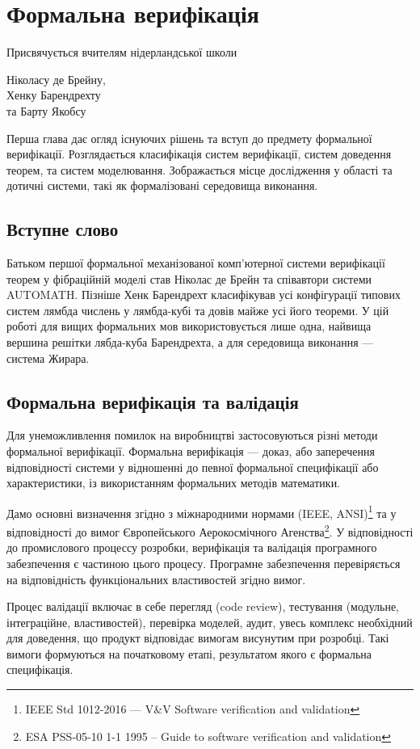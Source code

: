 \chapter{Формальна верифікація}
\epigraph{Присвячується вчителям нідерландської школи}{Ніколасу де Брейну, \\ Хенку Барендрехту \\ та Барту Якобсу}

Перша глава дає огляд існуючих рішень та вступ до предмету формальної верифікації.
Розглядається класифікація систем верифікації, систем доведення теорем, та систем
моделювання. Зображається місце дослідження у області та дотичні системи, такі як
формалізовані середовища виконання.

\section*{Вступне слово}
Батьком першої формальної механізованої комп'ютерної системи верифікації теорем у
фібраційній моделі став Ніколас де Брейн та співавтори системи AUTOMATH.
Пізніше Хенк Барендрехт класифікував усі конфігурації типових систем
лямбда числень у лямбда-кубі та довів майже усі його теореми. У цій роботі
для вищих формальних мов використовується лише одна,
найвища вершина решітки лябда-куба Барендрехта, а для середовища
виконання --- система Жирара.

\section{Формальна верифікація та валідація}
Для унеможливлення помилок на виробництві застосовуються різні
методи формальної верифікації. Формальна верифікація — доказ, або заперечення
відповідності системи у відношенні до певної формальної специфікації або характеристики,
із використанням формальних методів математики.

Дамо основні визначення згідно з міжнародними нормами (IEEE, ANSI)\footnote{IEEE Std 1012-2016  --- V\&V Software verification and validation} та у відповідності до вимог
Європейського Аерокосмічного Агенства\footnote{ESA PSS-05-10 1-1 1995 -- Guide to software verification and validation}.
У відповідності до промислового процессу розробки, верифікація та валідація програмного
забезпечення є частиною цього процесу. Програмне забезпечення перевіряється на
відповідність функціональних властивостей згідно вимог.

Процес валідації включає в себе перегляд (code review),
тестування (модульне, інтеграційне, властивостей), перевірка моделей, аудит,
увесь комплекс необхідний для доведення, що продукт відповідає вимогам
висунутим при розробці. Такі вимоги формуються на початковому етапі,
результатом якого є формальна специфікація.

